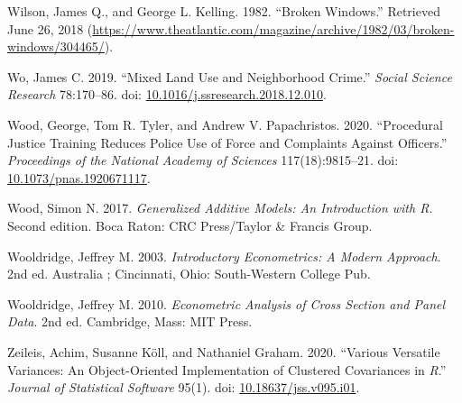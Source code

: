\documentclass [11pt, proquest] {uwthesis}[2015/03/03]
\newlength{\cslhangindent}
\newenvironment{CSLReferences}[2]%
{\setlength{\parindent}{0pt}%
\everypar{\setlength{\hangindent}{\cslhangindent}}\ignorespaces}%
{\par}
\begin{document}
\begin{CSLReferences}{1}{0}
\leavevmode\hypertarget{ref-wilsonBrokenWindows1982}{}%
Wilson, James Q., and George L. Kelling. 1982. {``Broken {Windows}.''} Retrieved June 26, 2018 (\url{https://www.theatlantic.com/magazine/archive/1982/03/broken-windows/304465/}).

\leavevmode\hypertarget{ref-woMixedLandUse2019}{}%
Wo, James C. 2019. {``Mixed Land Use and Neighborhood Crime.''} \emph{Social Science Research} 78:170--86. doi: \href{https://doi.org/10.1016/j.ssresearch.2018.12.010}{10.1016/j.ssresearch.2018.12.010}.

\leavevmode\hypertarget{ref-woodProceduralJusticeTraining2020}{}%
Wood, George, Tom R. Tyler, and Andrew V. Papachristos. 2020. {``Procedural Justice Training Reduces Police Use of Force and Complaints Against Officers.''} \emph{Proceedings of the National Academy of Sciences} 117(18):9815--21. doi: \href{https://doi.org/10.1073/pnas.1920671117}{10.1073/pnas.1920671117}.

\leavevmode\hypertarget{ref-woodGeneralizedAdditiveModels2017}{}%
Wood, Simon N. 2017. \emph{Generalized {Additive Models}: {An Introduction} with {R}}. Second edition. {Boca Raton}: {CRC Press/Taylor \& Francis Group}.

\leavevmode\hypertarget{ref-wooldridgeIntroductoryEconometricsModern2003}{}%
Wooldridge, Jeffrey M. 2003. \emph{Introductory Econometrics: A Modern Approach}. 2nd ed. {Australia ; Cincinnati, Ohio}: {South-Western College Pub}.

\leavevmode\hypertarget{ref-wooldridgeEconometricAnalysisCross2010}{}%
Wooldridge, Jeffrey M. 2010. \emph{Econometric {Analysis} of {Cross Section} and {Panel Data}}. 2nd ed. {Cambridge, Mass}: {MIT Press}.

\leavevmode\hypertarget{ref-zeileisVariousVersatileVariances2020}{}%
Zeileis, Achim, Susanne Köll, and Nathaniel Graham. 2020. {``Various {Versatile Variances}: {An Object}-{Oriented Implementation} of {Clustered Covariances} in {\emph{R}}.''} \emph{Journal of Statistical Software} 95(1). doi: \href{https://doi.org/10.18637/jss.v095.i01}{10.18637/jss.v095.i01}.

\end{CSLReferences}
\end{document}
